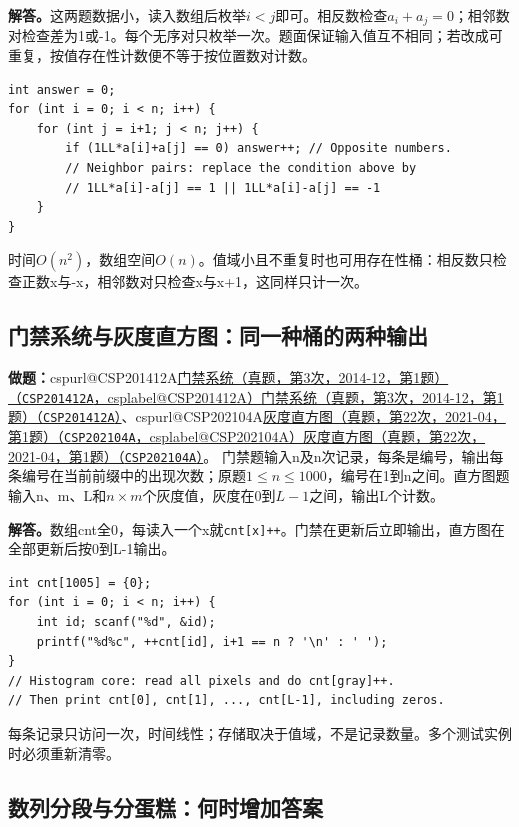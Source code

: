 \documentclass[UTF8,11pt,a4paper,fontset=none]{ctexart}
\makeatletter
\newcommand{\csp}[2]{\ifcsname cspurl@#1\endcsname\href{\csname cspurl@#1\endcsname}{#2（\texttt{#1}，\csname csplabel@#1\endcsname）}\else\href{https://oj.shumeng.tech/p/#1}{#2（\texttt{#1}）}\fi}
\makeatother
\begin{document}
\noindent\textbf{解答。}这两题数据小，读入数组后枚举$i<j$即可。相反数检查$a_i+a_j=0$；相邻数对检查差为1或-1。每个无序对只枚举一次。题面保证输入值互不相同；若改成可重复，按值存在性计数便不等于按位置数对计数。
\par\noindent\begin{minipage}{\linewidth}
\begin{lstlisting}
int answer = 0;
for (int i = 0; i < n; i++) {
    for (int j = i+1; j < n; j++) {
        if (1LL*a[i]+a[j] == 0) answer++; // Opposite numbers.
        // Neighbor pairs: replace the condition above by
        // 1LL*a[i]-a[j] == 1 || 1LL*a[i]-a[j] == -1
    }
}
\end{lstlisting}
\end{minipage}\par
时间$O(n^2)$，数组空间$O(n)$。值域小且不重复时也可用存在性桶：相反数只检查正数x与-x，相邻数对只检查x与x+1，这同样只计一次。
\subsection{门禁系统与灰度直方图：同一种桶的两种输出}

\noindent\textbf{做题：}\csp{CSP201412A}{门禁系统（真题，第3次，2014-12，第1题）}、\csp{CSP202104A}{灰度直方图（真题，第22次，2021-04，第1题）}。
门禁题输入n及n次记录，每条是编号，输出每条编号在当前前缀中的出现次数；原题$1\le n\le1000$，编号在1到n之间。直方图题输入n、m、L和$n\times m$个灰度值，灰度在0到$L-1$之间，输出L个计数。

\noindent\textbf{解答。}数组cnt全0，每读入一个x就\texttt{cnt[x]++}。门禁在更新后立即输出，直方图在全部更新后按0到L-1输出。
\par\noindent\begin{minipage}{\linewidth}
\begin{lstlisting}
int cnt[1005] = {0};
for (int i = 0; i < n; i++) {
    int id; scanf("%d", &id);
    printf("%d%c", ++cnt[id], i+1 == n ? '\n' : ' ');
}
// Histogram core: read all pixels and do cnt[gray]++.
// Then print cnt[0], cnt[1], ..., cnt[L-1], including zeros.
\end{lstlisting}
\end{minipage}\par
每条记录只访问一次，时间线性；存储取决于值域，不是记录数量。多个测试实例时必须重新清零。
\subsection{数列分段与分蛋糕：何时增加答案}
\end{document}
